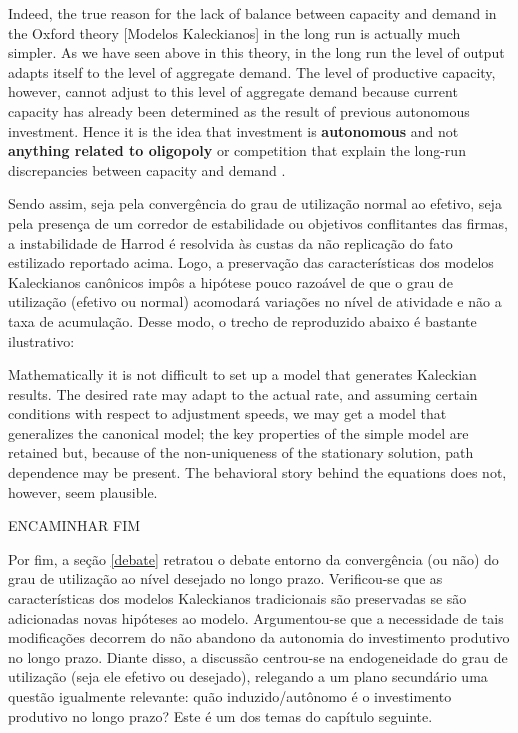 \begin{citacao}
Indeed, the true reason for the lack of balance between capacity and demand in the Oxford theory [Modelos Kaleckianos] in the long run is actually much simpler. As we have seen above in this theory, in the long run the level of output adapts itself to the level of aggregate demand. The level of productive capacity, however, cannot adjust to this level of aggregate demand because current capacity has already been determined as the result of previous autonomous investment. Hence it is the idea that investment is \textbf{autonomous} and not \textbf{anything related to oligopoly} or competition that explain the long-run discrepancies between capacity and demand .
\end{citacao}

Sendo assim, seja pela convergência do grau de utilização normal ao efetivo, seja pela presença de um corredor de estabilidade ou objetivos conflitantes das firmas, a instabilidade de Harrod é resolvida às custas da não replicação do fato estilizado reportado acima. Logo, a preservação das características dos modelos Kaleckianos canônicos impôs a hipótese pouco razoável de que o grau de utilização (efetivo ou normal) acomodará variações no nível de atividade e não a taxa de acumulação. Desse modo, o trecho de \textcite[p.~135]{skott_theoretical_2012} reproduzido abaixo é bastante ilustrativo:

\begin{citacao}
Mathematically it is not difficult to set up a model that generates Kaleckian results. The desired rate may adapt to the actual rate, and assuming
certain conditions with respect to adjustment speeds, we may get a model that
generalizes the canonical model; the key properties of the simple model are
retained but, because of the non-uniqueness of the stationary solution, path
dependence may be present. The behavioral story behind the equations does
not, however, seem plausible.
\end{citacao}

ENCAMINHAR FIM





Por fim, a seção \ref{debate} retratou o debate entorno da convergência (ou não) do grau de utilização ao nível desejado no longo prazo. Verificou-se que as características dos modelos Kaleckianos tradicionais são preservadas se são adicionadas novas hipóteses ao modelo. Argumentou-se que a necessidade de tais modificações decorrem do não abandono da autonomia do investimento produtivo no longo prazo. Diante disso, a discussão centrou-se na endogeneidade do grau de utilização (seja ele efetivo ou desejado), relegando a um plano secundário uma questão igualmente relevante: quão induzido/autônomo é o investimento produtivo no longo prazo? Este é um dos temas do capítulo seguinte.

